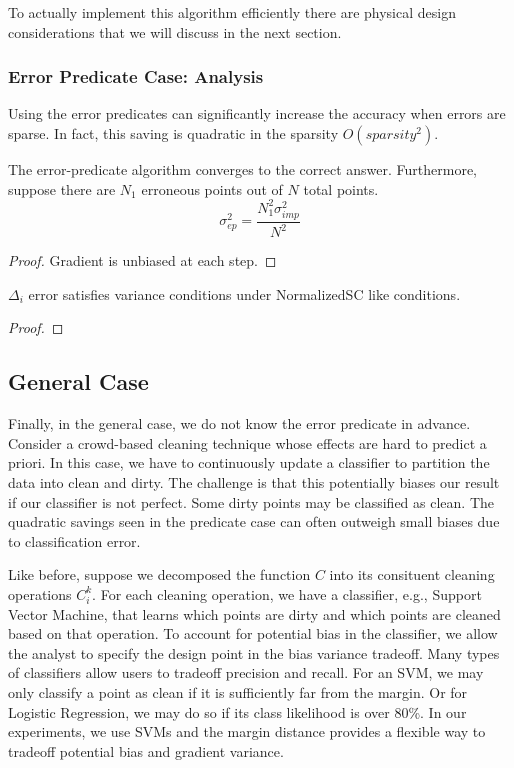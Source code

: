 To actually implement this algorithm efficiently there are physical design considerations that we will discuss in the next section.

\subsubsection{Error Predicate Case: Analysis}
Using the error predicates can significantly increase the accuracy when errors are sparse.
In fact, this saving is quadratic in the sparsity $O(sparsity^2)$.
\begin{theorem}
The error-predicate algorithm converges to the correct answer.
Furthermore, suppose there are $N_1$ erroneous points out of $N$ total points.
\[\sigma^2_{ep} = \frac{N^2_1\sigma^2_{imp}}{N^2}\]
\end{theorem}
\begin{proof}
Gradient is unbiased at each step.
\end{proof}

\begin{theorem}
$\Delta_i$ error satisfies variance conditions under NormalizedSC like conditions.
\end{theorem}
\begin{proof}
\end{proof}

\subsection{General Case}
Finally, in the general case, we do not know the error predicate in advance.
Consider a crowd-based cleaning technique whose effects are hard to predict a priori. 
In this case, we have to continuously update a classifier to partition the data into 
clean and dirty.
The challenge is that this potentially biases our result if our classifier is not perfect.
Some dirty points may be classified as clean.
The quadratic savings seen in the predicate case can often outweigh small biases due to classification error.

Like before, suppose we decomposed the function $C$ into its consituent cleaning operations ${C}_i^{k}$.
For each cleaning operation, we have a classifier, e.g., Support Vector Machine, that learns which points are dirty and which points are cleaned based on that operation.
To account for potential bias in the classifier, we allow the analyst to specify the design point in the bias variance tradeoff.
Many types of classifiers allow users to tradeoff precision and recall.
For an SVM, we may only classify a point as clean if it is sufficiently far from the margin.
Or for Logistic Regression, we may do so if its class likelihood is over 80\%.
In our experiments, we use SVMs and the margin distance provides a flexible way to tradeoff potential bias and gradient variance.

